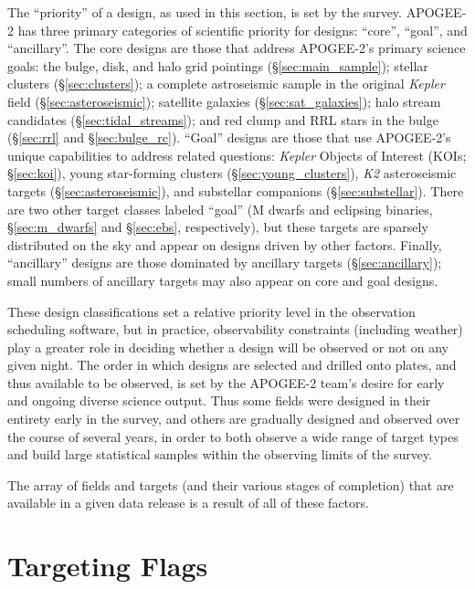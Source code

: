 \documentclass[12pt,twocolumn]{emulateapj}
\begin{document}
The ``priority'' of a design, as used in this section, is set by the survey.
APOGEE-2 has three primary categories of scientific priority for designs: 
``core'', ``goal'', and ``ancillary''.
The core designs are those that address APOGEE-2's primary science goals:
the bulge, disk, and halo grid pointings (\S\ref{sec:main_sample});
stellar clusters (\S\ref{sec:clusters}); a complete astroseismic sample in the
original {\it Kepler} field (\S\ref{sec:asteroseismic}); 
satellite galaxies (\S\ref{sec:sat_galaxies});
halo stream candidates (\S\ref{sec:tidal_streams});
and red clump and RRL stars in the bulge (\S\ref{sec:rrl} and \S\ref{sec:bulge_rc}).
``Goal'' designs are those that use APOGEE-2's unique capabilities to address
related questions: {\it Kepler} Objects of Interest (KOIs; \S\ref{sec:koi}),
young star-forming clusters (\S\ref{sec:young_clusters}), 
{\it K2} asteroseismic targets (\S\ref{sec:asteroseismic}), 
and substellar companions (\S\ref{sec:substellar}).
There are two other target classes labeled ``goal'' 
(M dwarfs and eclipsing binaries, \S\ref{sec:m_dwarfs} and \S\ref{sec:ebs}, respectively), 
but these targets are sparsely distributed on the sky and appear on designs driven
by other factors.
Finally, ``ancillary'' designs are those dominated by ancillary targets (\S\ref{sec:ancillary}); small numbers of ancillary targets may also appear on core and goal designs.

These design classifications set a relative priority level in the 
observation scheduling software, but in practice, observability constraints
(including weather) play a greater role in deciding whether a design will be
observed or not on any given night.  
The order in which designs are selected and drilled onto plates, 
and thus available to be observed, is set
by the APOGEE-2 team's desire for early and ongoing diverse science output.
Thus some fields were designed in their entirety early in the survey, and
others are gradually designed and observed over the course of several years,
in order to both observe a wide range of target types and build large statistical samples
within the observing limits of the survey.

The array of fields and targets (and their various stages of completion) that are
available in a given data release is a result of all of these factors.

\section{Targeting Flags}
\label{sec:targeting_flags}
\end{document}
